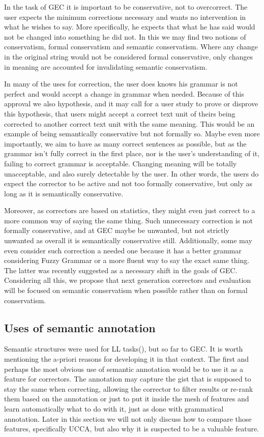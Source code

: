 \documentclass[english]{article}
\begin{document}
In the task of GEC it is important to be
conservative, not to overcorrect. The user expects the minimum corrections
necessary and wants no intervention in what he wishes to say. More
specifically, he expects that what he has said would not be changed
into something he did not. In this we may find two notions of conservatism,
formal conservatism and semantic conservatism. Where any change in
the original string would not be considered formal conservative, only
changes in meaning are accounted for invalidating semantic conservatism. 

In many of the uses for correction,
the user does knows his grammar is not perfect and would accept
a change in grammar when needed. Because of this approval we also
hypothesis, and it may call for a user study to prove or disprove
this hypothesis, that users might accept a correct text unit of theirs
being corrected to another correct text unit with the same meaning.
This would be an example of being semantically conservative but not formally so.
Maybe even more importantly, we aim to have as many correct sentences
as possible, but as the grammar isn't fully correct in the first place,
nor is the user's understanding of it, failing to correct grammar
is acceptable. Changing meaning will be totally unacceptable, and
also surely detectable by the user. In other words, the users do expect
the corrector to be active and not too formally conservative, but
only as long as it is semantically conservative. 

Moreover, as correctors are based on statistics, they might even
just correct to a more common way of saying the same thing. Such unnecessary
correction is not formally conservative, and at GEC maybe be unwanted, but not strictly unwanted as overall
it is semantically conservative still. Additionally, some may even
consider such correction a needed one because it has a better grammar considering
Fuzzy Grammar\cite{lakoff1973fuzzy,madnani2011they} or a more fluent
way to say the exact same thing. The latter was recently suggested as a necessary
shift in the goals of GEC\cite{sakaguchi2016reassessing}.
Considering all this, we propose that next generation correctors and evaluation will be focused on semantic conservatism
when possible rather than on formal conservatism.

\subsection{Uses of semantic annotation}

Semantic structures were used for LL tasks(\cite{king2013shallow}), but so far to GEC. It is worth mentioning the a-priori reasons for developing
it in that context. The first and perhaps the most obvious use of semantic annotation
would be to use it as a feature for correctors. The annotation may
capture the gist that is supposed to stay the same when correcting,
allowing the corrector to filter results or re-rank them based on
the annotation or just to put it inside the mesh of features and learn
automatically what to do with it, just as done with grammatical annotation.
Later in this section we will not only discuss how to compare those
features, specifically UCCA, but also why it is suspected to be a
valuable feature.
\end{document}
